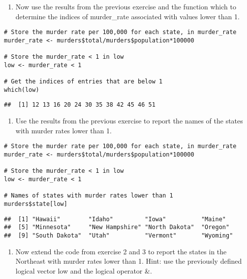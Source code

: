 \documentclass[
]{article}
\providecommand{\tightlist}{%
  \setlength{\itemsep}{0pt}\setlength{\parskip}{0pt}}
\begin{document}
\begin{enumerate}
\def\labelenumi{\arabic{enumi}.}
\setcounter{enumi}{1}
\tightlist
\item
  Now use the results from the previous exercise and the function which
  to determine the indices of murder\_rate associated with values lower
  than 1.
\end{enumerate}

\begin{verbatim}
# Store the murder rate per 100,000 for each state, in murder_rate
murder_rate <- murders$total/murders$population*100000

# Store the murder_rate < 1 in low 
low <- murder_rate < 1

# Get the indices of entries that are below 1
which(low)
\end{verbatim}

\begin{verbatim}
##  [1] 12 13 16 20 24 30 35 38 42 45 46 51
\end{verbatim}

\begin{enumerate}
\def\labelenumi{\arabic{enumi}.}
\setcounter{enumi}{2}
\tightlist
\item
  Use the results from the previous exercise to report the names of the
  states with murder rates lower than 1.
\end{enumerate}

\begin{verbatim}
# Store the murder rate per 100,000 for each state, in murder_rate
murder_rate <- murders$total/murders$population*100000

# Store the murder_rate < 1 in low 
low <- murder_rate < 1

# Names of states with murder rates lower than 1
murders$state[low]
\end{verbatim}

\begin{verbatim}
##  [1] "Hawaii"        "Idaho"         "Iowa"          "Maine"        
##  [5] "Minnesota"     "New Hampshire" "North Dakota"  "Oregon"       
##  [9] "South Dakota"  "Utah"          "Vermont"       "Wyoming"
\end{verbatim}

\begin{enumerate}
\def\labelenumi{\arabic{enumi}.}
\setcounter{enumi}{3}
\tightlist
\item
  Now extend the code from exercise 2 and 3 to report the states in the
  Northeast with murder rates lower than 1. Hint: use the previously
  defined logical vector low and the logical operator \&.
\end{enumerate}
\end{document}
